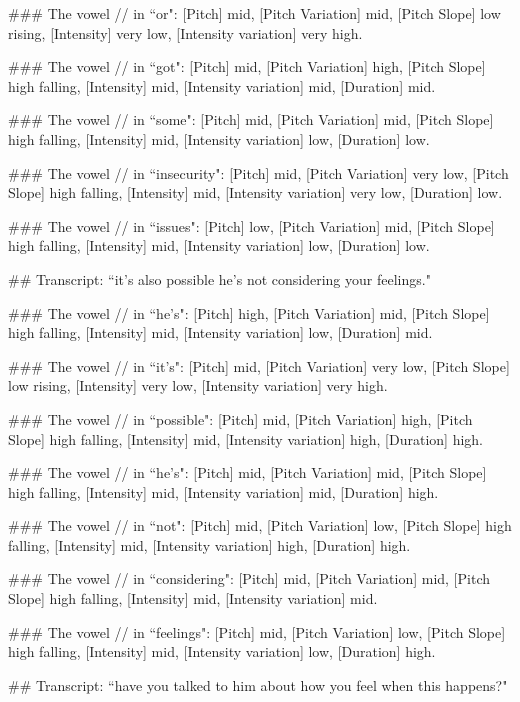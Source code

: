 \begin{tcolorbox}[blue_box, title = {{Example: Vowel-level Acoustic Feature}}]
\#\#\# The vowel // in ``or": [Pitch] mid, [Pitch Variation] mid, [Pitch Slope] low rising, [Intensity] very low, [Intensity variation] very high.

\#\#\# The vowel // in ``got": [Pitch] mid, [Pitch Variation] high, [Pitch Slope] high falling, [Intensity] mid, [Intensity variation] mid, [Duration] mid.

\#\#\# The vowel // in ``some": [Pitch] mid, [Pitch Variation] mid, [Pitch Slope] high falling, [Intensity] mid, [Intensity variation] low, [Duration] low.

\#\#\# The vowel // in ``insecurity": [Pitch] mid, [Pitch Variation] very low, [Pitch Slope] high falling, [Intensity] mid, [Intensity variation] very low, [Duration] low.

\#\#\# The vowel // in ``issues": [Pitch] low, [Pitch Variation] mid, [Pitch Slope] high falling, [Intensity] mid, [Intensity variation] low, [Duration] low.

\#\# Transcript: ``it's also possible he's not considering your feelings."

\#\#\# The vowel // in ``he's": [Pitch] high, [Pitch Variation] mid, [Pitch Slope] high falling, [Intensity] mid, [Intensity variation] low, [Duration] mid.

\#\#\# The vowel // in ``it's": [Pitch] mid, [Pitch Variation] very low, [Pitch Slope] low rising, [Intensity] very low, [Intensity variation] very high.

\#\#\# The vowel // in ``possible": [Pitch] mid, [Pitch Variation] high, [Pitch Slope] high falling, [Intensity] mid, [Intensity variation] high, [Duration] high.

\#\#\# The vowel // in ``he's": [Pitch] mid, [Pitch Variation] mid, [Pitch Slope] high falling, [Intensity] mid, [Intensity variation] mid, [Duration] high.

\#\#\# The vowel // in ``not": [Pitch] mid, [Pitch Variation] low, [Pitch Slope] high falling, [Intensity] mid, [Intensity variation] high, [Duration] high.

\#\#\# The vowel // in ``considering": [Pitch] mid, [Pitch Variation] mid, [Pitch Slope] high falling, [Intensity] mid, [Intensity variation] mid.

\#\#\# The vowel // in ``feelings": [Pitch] mid, [Pitch Variation] low, [Pitch Slope] high falling, [Intensity] mid, [Intensity variation] low, [Duration] high.

\#\# Transcript: ``have you talked to him about how you feel when this happens?"


\end{tcolorbox}

